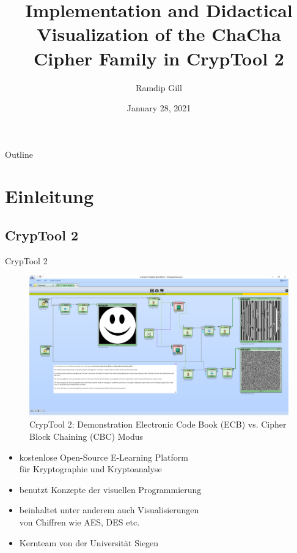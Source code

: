 \documentclass{beamer}
\title[Impl. and Visualization of the ChaCha Cipher Family in CT2]{Implementation and Didactical Visualization of the ChaCha Cipher Family in CrypTool 2}
\author{Ramdip Gill}
\institute{University of Heidelberg}
\date{January 28, 2021}
\begin{document}
\begin{frame}[plain]
  \titlepage
\end{frame}

\begin{frame}[plain]{Outline}
  \tableofcontents
\end{frame}

\section{Einleitung}

\subsection{CrypTool 2}
\begin{frame}{CrypTool 2}
\begin{figure}
\center
\begin{minipage}{.5\textwidth}
\includegraphics[width=\textwidth]{010_Block_Modes_Symmetric_Ciphers.png}
\caption{CrypTool 2: Demonstration Electronic Code Book (ECB) vs. Cipher Block Chaining (CBC) Modus}
\end{minipage}
\end{figure}
\begin{itemize}
\item kostenlose Open-Source E-Learning Platform \\für Kryptographie und Kryptoanalyse
\item benutzt Konzepte der visuellen Programmierung
\item beinhaltet unter anderem auch Visualisierungen \\von Chiffren wie AES, DES etc.
\item Kernteam von der Universität Siegen
\end{itemize}
\end{frame}
\end{document}
